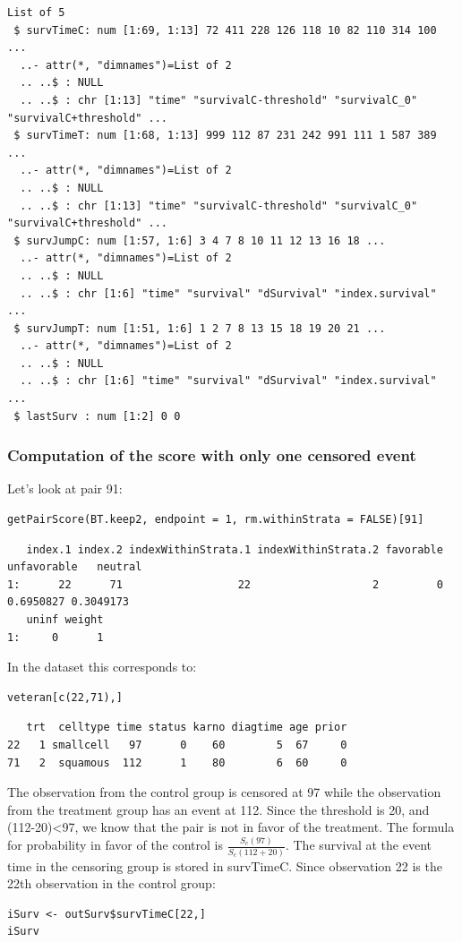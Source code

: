 \documentclass[12pt]{article}
\begin{document}
\begin{verbatim}
List of 5
 $ survTimeC: num [1:69, 1:13] 72 411 228 126 118 10 82 110 314 100 ...
  ..- attr(*, "dimnames")=List of 2
  .. ..$ : NULL
  .. ..$ : chr [1:13] "time" "survivalC-threshold" "survivalC_0" "survivalC+threshold" ...
 $ survTimeT: num [1:68, 1:13] 999 112 87 231 242 991 111 1 587 389 ...
  ..- attr(*, "dimnames")=List of 2
  .. ..$ : NULL
  .. ..$ : chr [1:13] "time" "survivalC-threshold" "survivalC_0" "survivalC+threshold" ...
 $ survJumpC: num [1:57, 1:6] 3 4 7 8 10 11 12 13 16 18 ...
  ..- attr(*, "dimnames")=List of 2
  .. ..$ : NULL
  .. ..$ : chr [1:6] "time" "survival" "dSurvival" "index.survival" ...
 $ survJumpT: num [1:51, 1:6] 1 2 7 8 13 15 18 19 20 21 ...
  ..- attr(*, "dimnames")=List of 2
  .. ..$ : NULL
  .. ..$ : chr [1:6] "time" "survival" "dSurvival" "index.survival" ...
 $ lastSurv : num [1:2] 0 0
\end{verbatim}

\subsubsection{Computation of the score with only one censored event}
\label{sec:orgf7bac9f}

Let's look at pair 91:
\lstset{language=r,label= ,caption= ,captionpos=b,numbers=none}
\begin{lstlisting}
getPairScore(BT.keep2, endpoint = 1, rm.withinStrata = FALSE)[91]
\end{lstlisting}

\begin{verbatim}
   index.1 index.2 indexWithinStrata.1 indexWithinStrata.2 favorable unfavorable   neutral
1:      22      71                  22                   2         0   0.6950827 0.3049173
   uninf weight
1:     0      1
\end{verbatim}


In the dataset this corresponds to:
\lstset{language=r,label= ,caption= ,captionpos=b,numbers=none}
\begin{lstlisting}
veteran[c(22,71),]
\end{lstlisting}

\begin{verbatim}
   trt  celltype time status karno diagtime age prior
22   1 smallcell   97      0    60        5  67     0
71   2  squamous  112      1    80        6  60     0
\end{verbatim}


The observation from the control group is censored at 97 while the
observation from the treatment group has an event at 112. Since the
threshold is 20, and (112-20)<97, we know that the pair is not in
favor of the treatment. The formula for probability in favor of the
control is \(\frac{S_c(97)}{S_c(112+20)}\). The survival at the event
time in the censoring group is stored in survTimeC. Since observation
22 is the 22th observation in the control group:
\lstset{language=r,label= ,caption= ,captionpos=b,numbers=none}
\begin{lstlisting}
iSurv <- outSurv$survTimeC[22,] 
iSurv
\end{lstlisting}
\end{document}
